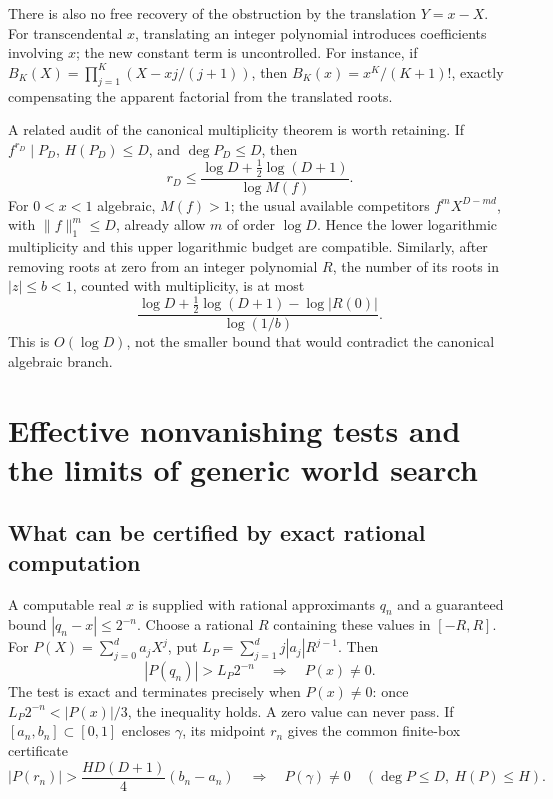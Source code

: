 \documentclass[11pt,a4paper]{article}
\theoremstyle{definition}
\theoremstyle{remark}
\numberwithin{equation}{section}
\begin{document}
There is also no free recovery of the obstruction by the translation
\(Y=x-X\). For transcendental \(x\), translating an integer polynomial
introduces coefficients involving \(x\); the new constant term is
uncontrolled. For instance, if
\(B_K(X)=\prod_{j=1}^K(X-xj/(j+1))\), then
\(B_K(x)=x^K/(K+1)!\), exactly compensating the apparent factorial from
the translated roots.

A related audit of the canonical multiplicity theorem is worth retaining.
If \(f^{r_D}\mid P_D\), \(H(P_D)\le D\), and \(\deg P_D\le D\), then
\[
 r_D\le\frac{\log D+\frac12\log(D+1)}{\log M(f)}.
\]
For \(0<x<1\) algebraic, \(M(f)>1\); the usual available competitors
\(f^mX^{D-md}\), with \(\|f\|_1^m\le D\), already allow
\(m\) of order \(\log D\). Hence the lower logarithmic multiplicity
and this upper logarithmic budget are compatible. Similarly, after
removing roots at zero from an integer polynomial \(R\), the number
of its roots in \(|z|\le b<1\), counted with multiplicity, is at most
\[
 \frac{\log D+\frac12\log(D+1)-\log|R(0)|}{\log(1/b)}.
\]
This is \(O(\log D)\), not the smaller bound that would contradict the
canonical algebraic branch.

\section{Effective nonvanishing tests and the limits of generic world search}
\label{wr:sec-effective-logic}

\subsection{What can be certified by exact rational computation}

A computable real \(x\) is supplied with rational approximants \(q_n\)
and a guaranteed bound \(|q_n-x|\le2^{-n}\). Choose a rational \(R\)
containing these values in \([-R,R]\). For
\(P(X)=\sum_{j=0}^d a_jX^j\), put
\(L_P=\sum_{j=1}^d j|a_j|R^{j-1}\). Then
\begin{equation}\label{wr:eq-semidecision}
 |P(q_n)|>L_P2^{-n}\quad\Longrightarrow\quad P(x)\ne0.
\end{equation}
The test is exact and terminates precisely when \(P(x)\ne0\): once
\(L_P2^{-n}<|P(x)|/3\), the inequality holds. A zero value can never
pass. If \([a_n,b_n]\subset[0,1]\) encloses \(\gamma\), its midpoint
\(r_n\) gives the common finite-box certificate
\begin{equation}\label{wr:eq-box-certificate}
 |P(r_n)|>\frac{HD(D+1)}4(b_n-a_n)
 \quad\Longrightarrow\quad P(\gamma)\ne0
 \quad(\deg P\le D,\ H(P)\le H).
\end{equation}
\end{document}
